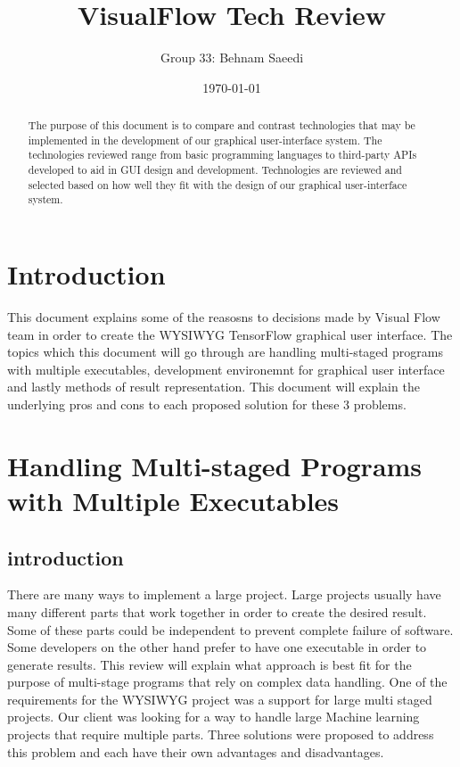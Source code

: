 \documentclass[journal,10pt,onecolumn,compsoc]{IEEEtran} \usepackage[margin=1.0in]{geometry} \usepackage{pdfpages} \usepackage{graphicx}
\title{VisualFlow Tech Review}
\author{Group 33: Behnam Saeedi}
\date{\today}
\begin{document}
\maketitle
\begin{abstract}
The purpose of this document is to compare and contrast technologies that may be implemented in the development of our graphical user-interface system. 
The technologies reviewed range from basic programming languages to third-party APIs developed to aid in GUI design and development.
Technologies are reviewed and selected based on how well they fit with the design of our graphical user-interface system.
\end{abstract}
\newpage
\tableofcontents
\newpage
\section{Introduction}
This document explains some of the reasosns to decisions made by Visual Flow team in order to create the WYSIWYG TensorFlow graphical user interface.
The topics which this document will go through are handling multi-staged programs with multiple executables, 
development environemnt for graphical user interface and lastly methods of result representation.
This document will explain the underlying pros and cons to each proposed solution for these 3 problems.

\section{Handling Multi-staged Programs with Multiple Executables}
\subsection{introduction}
There are many ways to implement a large project. 
Large projects usually have many different parts that work together in order to create the desired result. 
Some of these parts could be independent to prevent complete failure of software. \cite{streamprocessing}
Some developers on the other hand prefer to have one executable in order to generate results. 
This review will explain what approach is best fit for the purpose of multi-stage programs that rely on complex data handling. 
One of the requirements for the WYSIWYG project was a support for large multi staged projects. 
Our client was looking for a way to handle large Machine learning projects that require multiple parts. 
Three solutions were proposed to address this problem and each have their own advantages and disadvantages.
\end{document}
